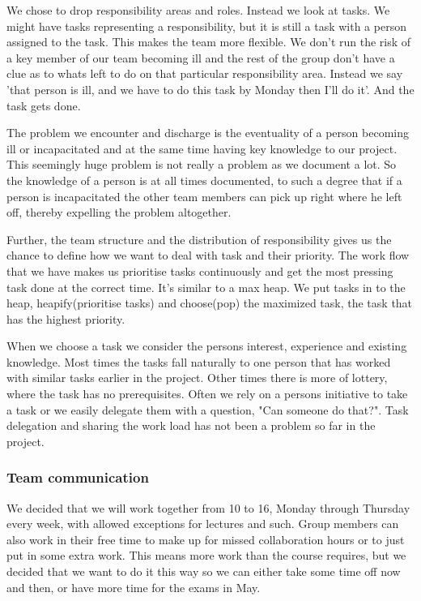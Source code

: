     We chose to drop responsibility areas and roles. Instead we look at tasks. We might have tasks representing a responsibility, but it is still a task with a person assigned to the task. This makes the team more flexible. We don't run the risk of a key member of our team becoming ill and the rest of the group don't have a clue as to whats left to do on that particular responsibility area. Instead we say 'that person is ill, and we have to do this task by Monday then I'll do it'. And the task gets done.
    
    The problem we encounter and discharge is the eventuality of a person becoming ill or incapacitated and at the same time having key knowledge to our project. This seemingly huge problem is not really a problem as we document a lot. So the knowledge of a person is at all times documented, to such a degree that if a person is incapacitated the other team members can pick up right where he left off, thereby expelling the problem altogether. 
    
    Further, the team structure and the distribution of responsibility gives us the chance to define how we want to deal with task and their priority. The work flow that we have makes us prioritise tasks continuously and get the most pressing task done at the correct time. It's similar to a max heap. We put tasks in to the heap, heapify(prioritise tasks) and choose(pop) the maximized task, the task that has the highest priority. 
    
    When we choose a task we consider the persons interest, experience and existing knowledge. Most times the tasks fall naturally to one person that has worked with similar tasks earlier in the project. Other times there is more of lottery, where the task has no prerequisites. Often we rely on a persons initiative to take a task or we easily delegate them with a question, "Can someone do that?". Task delegation and sharing the work load has not been a problem so far in the project.
    
    
    \subsubsection{Team communication}\label{Team communication}
    We decided that we will work together from 10 to 16, Monday through Thursday every week, with allowed exceptions for lectures and such. Group members can also work in their free time to make up for missed collaboration hours or to just put in some extra work. This means more work than the course requires, but we decided that we want to do it this way so we can either take some time off now and then, or have more time for the exams in May.

